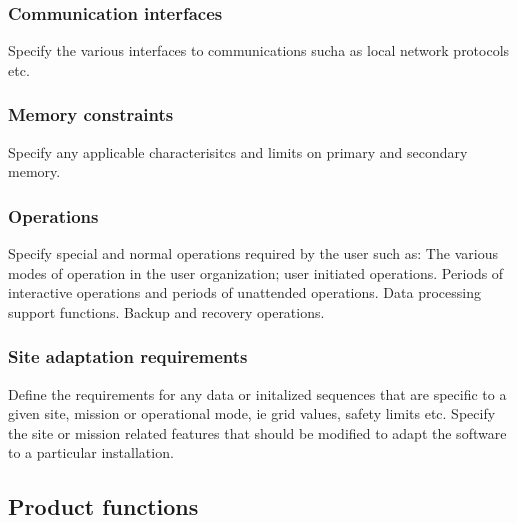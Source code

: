 \documentclass[12pt]{article}
\begin{document}
	  \subsubsection{Communication interfaces}
	  Specify the various interfaces to communications sucha as local network protocols etc.

	  \subsubsection{Memory constraints}
	  Specify any applicable characterisitcs and limits on primary and secondary memory.

	  \subsubsection{Operations}
	  Specify special and normal operations required by the user such as:
	  The various modes of operation in the user organization; user initiated operations.
	  Periods of interactive operations and periods of unattended operations.
	  Data processing support functions.
	  Backup and recovery operations.

	  \subsubsection{Site adaptation requirements}
	  Define the requirements for any data or initalized sequences that are specific to a given site, mission or operational mode, ie grid values, safety limits etc.
	  Specify the site or mission related features that should be modified to adapt the software to a particular installation. 

     \subsection{Product functions}
     
\end{document}
